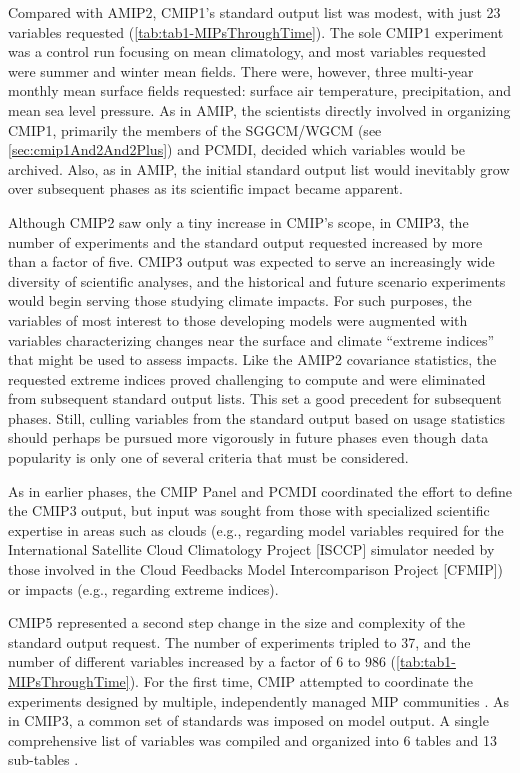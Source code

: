 \documentclass[manuscript]{copernicus}
\begin{document}
Compared with AMIP2, CMIP1's standard output list was modest, with just 23 variables requested (\autoref{tab:tab1-MIPsThroughTime}). The sole CMIP1 experiment was a control run focusing on mean climatology, and most variables requested were summer and winter mean fields. There were, however, three multi-year monthly mean surface fields requested: surface air temperature, precipitation, and mean sea level pressure. As in AMIP, the scientists directly involved in organizing CMIP1, primarily the members of the SGGCM/WGCM (see \autoref{sec:cmip1And2And2Plus}) and PCMDI, decided which variables would be archived. Also, as in AMIP, the initial standard output list would inevitably grow over subsequent phases as its scientific impact became apparent.

Although CMIP2 saw only a tiny increase in CMIP's scope, in CMIP3, the number of experiments and the standard output requested increased by more than a factor of five. CMIP3 output was expected to serve an increasingly wide diversity of scientific analyses, and the historical and future scenario experiments would begin serving those studying climate impacts. For such purposes, the variables of most interest to those developing models were augmented with variables characterizing changes near the surface and climate ``extreme indices'' that might be used to assess impacts. Like the AMIP2 covariance statistics, the requested extreme indices proved challenging to compute and were eliminated from subsequent standard output lists. This set a good precedent for subsequent phases. Still, culling variables from the standard output based on usage statistics should perhaps be pursued more vigorously in future phases even though data popularity is only one of several criteria that must be considered. 

As in earlier phases, the CMIP Panel and PCMDI coordinated the effort to define the CMIP3 output, but input was sought from those with specialized scientific expertise in areas such as clouds (e.g., regarding model variables required for the International Satellite Cloud Climatology Project [ISCCP] simulator needed by those involved in the Cloud Feedbacks Model Intercomparison Project [CFMIP]) or impacts (e.g., regarding extreme indices).

CMIP5 represented a second step change in the size and complexity of the standard output request. The number of experiments tripled to 37, and the number of different variables increased by a factor of 6 to 986 (\autoref{tab:tab1-MIPsThroughTime}). For the first time, CMIP attempted to coordinate the experiments designed by multiple, independently managed MIP communities \citep[and all experiments were briefly described by the CMIP5 overview paper,][also see \autoref{tab:tabAppA1-MIPExperiments}]{taylor_overview_2012}. As in CMIP3, a common set of standards was imposed on model output. A single comprehensive list of variables was compiled and organized into 6 tables and 13 sub-tables \citep[\autoref{tab:tab1-MIPsThroughTime}, \autoref{tab:tabAppB1-MIPStandardOutput};][]{taylor_pcmdi_2013}.
\end{document}
